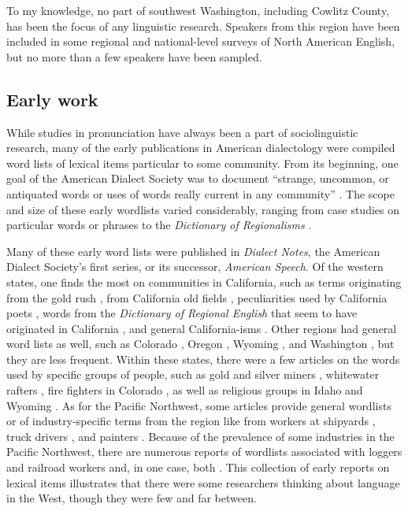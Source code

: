 To my knowledge, no part of southwest Washington, including Cowlitz County, has been the focus of any linguistic research. Speakers from this region have been included in some regional and national-level surveys of North American English, but no more than a few speakers have been sampled.




\subsection{Early work}

While studies in pronunciation have always been a part of sociolinguistic research, many of the early publications in American dialectology were compiled word lists of lexical items particular to some community. From its beginning, one goal of the American Dialect Society was to document ``strange, uncommon, or antiquated words or uses of words really current in any community'' \citep[18]{sheldon_1889}. The scope and size of these early wordlists varied considerably, ranging from case studies on particular words or phrases \citep{pound_1929, pearce_1958} to the \textit{Dictionary of Regionalisms} \citep{bartlett_1848}.

Many of these early word lists were published in \textit{Dialect Notes}, the American Dialect Society's first series, or its successor, \textit{American Speech}. Of the western states, one finds the most on communities in California, such as terms originating from the gold rush \citep{hamilton_1932, moore_1926}, from California old fields \citep{pond_1932}, peculiarities used by California poets \citep{grant_1942}, words from the \textit{Dictionary of Regional English} that seem to have originated in California \citep{shulman_1949}, and general California-isms \citep{lehman_1921, watkins_mulhall_1951}. Other regions had general word lists as well, such as Colorado \citep{davidson_koehler_1932}, Oregon \citep{hausen_1931}, Wyoming \citep{clough_1936, clough_1954}, and Washington \citep{adams_1958}, but they are less frequent. Within these states, there were a few articles on the words used by specific groups of people, such as gold and silver miners \citep{davidson_1929}, whitewater rafters \citep{akin_goltry_1969}, fire fighters in Colorado \citep{yelsma_1969}, as well as religious groups in Idaho and Wyoming \citep{jensen_1931, lindsay_1933}. As for the Pacific Northwest, some articles provide general wordlists \citep{harvey_1914_part1, harvey_1914_part2, finder_1965} or of industry-specific terms from the region like from workers at shipyards \citep{babbitt_1944}, truck drivers \citep{hanley_1961}, and painters \citep{hines_1969}. Because of the prevalence of some industries in the Pacific Northwest, there are numerous reports of wordlists associated with loggers \citep{stevens_1925, davis_1942, davis_1950, carranco_1956, mcculloch_1958} and railroad workers \citep{batie_1934, schultz_1937, snapp_logan_1938, cottrell_montgomery_1943} and, in one case, both \citep{carranco_1962}. This collection of early reports on lexical items illustrates that there were some researchers thinking about language in the West, though they were few and far between.

